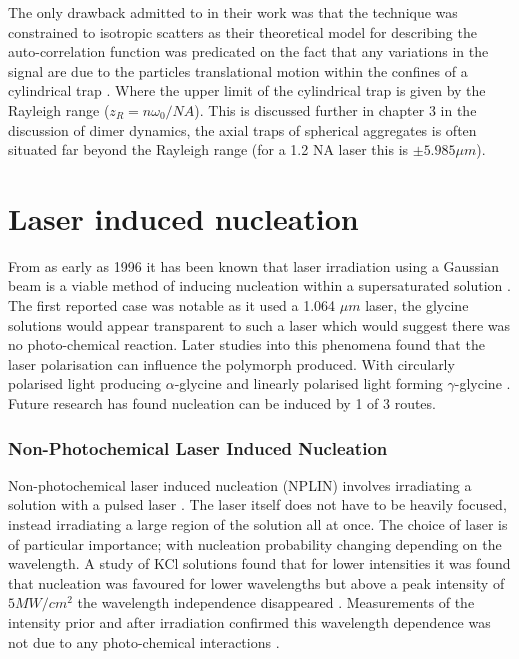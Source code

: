 The only drawback admitted to in their work was that the technique 
was constrained to isotropic scatters as their theoretical model 
for describing the auto-correlation function was predicated on the 
fact that any variations in the signal are due to the particles 
translational motion within the confines of a cylindrical trap 
\cite{BarZiv1997}. Where the upper limit of the cylindrical trap 
is given by the Rayleigh range ($z_R = n\omega_0/NA$). This is 
discussed further in chapter 3 in the discussion of dimer dynamics, 
the axial traps of spherical aggregates is often situated far beyond the Rayleigh range (for a 1.2 NA laser this is $\pm5.985 \mu m$).
 
\section{Laser induced nucleation}
From as early as 1996 it has been known that laser irradiation 
using a Gaussian beam is a viable method of inducing nucleation 
within a supersaturated solution \cite{Garetz1996}. The first 
reported case was notable as it used a 1.064 $\mu m$ laser, the 
glycine solutions would appear transparent to such a laser which 
would suggest there was no photo-chemical reaction. Later studies 
into this phenomena found that the laser polarisation can influence 
the polymorph produced. With circularly polarised light producing 
$\alpha$-glycine and linearly polarised light forming $\gamma$-glycine 
\cite{Garetz2002}. Future research has found nucleation can be 
induced by 1 of 3 routes.

\subsubsection{Non-Photochemical Laser Induced Nucleation}
Non-photochemical laser induced nucleation (NPLIN) involves 
irradiating a solution with a pulsed laser \cite{Garetz1996,
	Garetz2002,Sun2006}. The laser itself does not have to be 
heavily focused, instead irradiating a large region of the 
solution all at once. The choice of laser is of particular 
importance; with nucleation probability changing depending 
on the wavelength. A study of KCl solutions found that for 
lower intensities it was found that nucleation was favoured 
for lower wavelengths but above a peak intensity of $5 MW/
cm^2$ the wavelength independence disappeared \cite{Kacker2017}. 
Measurements of the intensity prior and after irradiation 
confirmed this wavelength dependence was not due to any 
photo-chemical interactions \cite{Kacker2017}.

